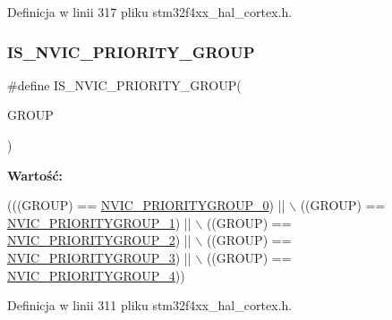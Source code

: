 Definicja w linii 317 pliku stm32f4xx\+\_\+hal\+\_\+cortex.\+h.

\mbox{\label{group___c_o_r_t_e_x___private___macros_ga6569304a39fe4f91bd59b6a586c8ede9}} 
\subsubsection{\texorpdfstring{I\+S\+\_\+\+N\+V\+I\+C\+\_\+\+P\+R\+I\+O\+R\+I\+T\+Y\+\_\+\+G\+R\+O\+UP}{IS\_NVIC\_PRIORITY\_GROUP}}
{\footnotesize\ttfamily \#define I\+S\+\_\+\+N\+V\+I\+C\+\_\+\+P\+R\+I\+O\+R\+I\+T\+Y\+\_\+\+G\+R\+O\+UP(\begin{DoxyParamCaption}\item[{}]{G\+R\+O\+UP }\end{DoxyParamCaption})}

{\bfseries Wartość\+:}
\begin{DoxyCode}
(((GROUP) == \hyperlink{group___c_o_r_t_e_x___preemption___priority___group_ga5e97dcff77680602c86e44f23f5ffa1a}{NVIC\_PRIORITYGROUP\_0}) || \(\backslash\)
                                       ((GROUP) == \hyperlink{group___c_o_r_t_e_x___preemption___priority___group_ga702227137b010421c3a3b6434005a132}{NVIC\_PRIORITYGROUP\_1}) || \(\backslash\)
                                       ((GROUP) == \hyperlink{group___c_o_r_t_e_x___preemption___priority___group_gaa43a3fd37850c120ce567ab2743d11b4}{NVIC\_PRIORITYGROUP\_2}) || \(\backslash\)
                                       ((GROUP) == \hyperlink{group___c_o_r_t_e_x___preemption___priority___group_ga8ddb24962e6f0fc3273139d45d374b09}{NVIC\_PRIORITYGROUP\_3}) || \(\backslash\)
                                       ((GROUP) == \hyperlink{group___c_o_r_t_e_x___preemption___priority___group_gae6eab9140204bc938255aa148e597c45}{NVIC\_PRIORITYGROUP\_4}))
\end{DoxyCode}


Definicja w linii 311 pliku stm32f4xx\+\_\+hal\+\_\+cortex.\+h.

\mbox{\label{group___c_o_r_t_e_x___private___macros_ga010705bc997dcff935b965b372cba61d}} 
